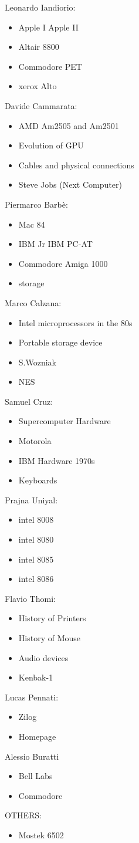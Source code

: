 \documentclass[]{article}
\begin{document}
\newpage
\noindent Leonardo Iandiorio:
\begin{itemize}
\item Apple I Apple II
\item Altair 8800
\item Commodore PET
\item xerox Alto
\end{itemize}
Davide Cammarata:
\begin{itemize}
\item AMD Am2505 and Am2501
\item Evolution of GPU
\item Cables and physical connections
\item Steve Jobs (Next Computer)
\end{itemize}
Piermarco Barbè:
\begin{itemize}
\item Mac 84
\item IBM Jr IBM PC-AT
\item Commodore Amiga 1000
\item storage
\end{itemize}
Marco Calzana:
\begin{itemize}
\item Intel microprocessors in the 80s
\item Portable storage device
\item  S.Wozniak
\item NES
\end{itemize}
Samuel Cruz:
\begin{itemize}
\item Supercomputer Hardware
\item Motorola
\item IBM Hardware 1970s 
\item Keyboards
\end{itemize}
Prajna Uniyal:
\begin{itemize}
\item intel 8008
\item intel 8080
\item intel 8085
\item intel 8086
\end{itemize}
Flavio Thomi:
\begin{itemize}
\item History of Printers
\item History of Mouse
\item Audio devices
\item Kenbak-1
\end{itemize}
Lucas Pennati:
\begin{itemize}
\item Zilog
\item Homepage
\end{itemize}
Alessio Buratti
\begin{itemize}
\item Bell Labs
\item Commodore
\end{itemize}
OTHERS:
\begin{itemize}
\item Mostek 6502
\end{itemize}
\end{document}
